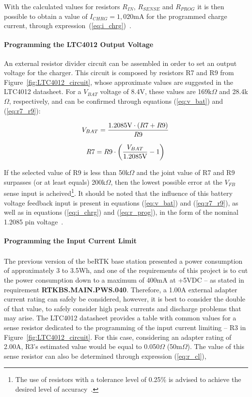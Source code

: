 With the calculated values for resistors $R_{IN}$, $R_{SENSE}$ and $R_{PROG}$ it is then possible to obtain a value of $I_{CHRG} = 1,020$mA for the programmed charge current, through expression~(\ref{eq:i_chrg})~\cite{LTC4012}.

\paragraph{Programming the LTC4012 Output Voltage}	An external resistor divider circuit can be assembled in order to set an output voltage for the charger. This circuit is composed by resistors R7 and R9 from Figure~\ref{fig:LTC4012_circuit}, whose approximate values are suggested in the LTC4012 datasheet. For a $V_{BAT}$ voltage of 8.4V, these values are 169k$\Omega$ and 28.4k$\Omega$, respectively, and can be confirmed through equations (\ref{eq:v_bat}) and (\ref{eq:r7_r9}):

\begin{equation}\label{eq:v_bat}
    V_{BAT}=\frac{1.2085\textrm{V} \cdot \left(R7 + R9\right)}{R9}\,\medskip
\end{equation}

\begin{equation}\label{eq:r7_r9}
    R7=R9 \cdot \left(\frac{V_{BAT}}{1.2085\textrm{V}} - 1\right)\,\medskip
\end{equation}

If the selected value of R9 is less than 50k$\Omega$ and the joint value of R7 and R9 surpasses (or at least equals) 200k$\Omega$, then the lowest possible error at the $V_{FB}$ sense input is acheived\footnote[9]{The use of resistors with a tolerance level of 0.25\% is advised to achieve the desired level of accuracy~\cite{LTC4012}.}. It should be noted that the influence of this battery voltage feedback input is present in equations (\ref{eq:v_bat}) and (\ref{eq:r7_r9}), as well as in equations (\ref{eq:i_chrg}) and (\ref{eq:r_prog}), in the form of the nominal 1.2085 pin voltage~\cite{LTC4012}.

\paragraph{Programming the Input Current Limit}	The previous version of the beRTK\textsuperscript{\textregistered} base station presented a power consumption of approximately 3 to 3.5Wh, and one of the requirements of this project is to cut the power consumption down to a maximum of 400mA at +5VDC -- as stated in requirement \textbf{RTKBS.MAIN.PWS.040}. Therefore, a 1.00A external adapter current rating can safely be considered, however, it is best to consider the double of that value, to safely consider high peak currents and discharge problems that may arise.
The LTC4012 datasheet provides a table with common values for a sense resistor dedicated to the programming of the input current limiting -- R3 in Figure~\ref{fig:LTC4012_circuit}. For this case, considering an adapter rating of 2.00A, R3's estimated value would be equal to 0.050$\Omega$ (50m$\Omega$). The value of this sense resistor can also be determined through expression (\ref{eq:r_cl}),

